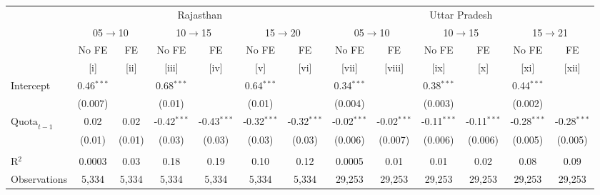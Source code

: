 
\begingroup
\centering
\scriptsize
\begin{adjustbox}{max width=\linewidth}
   \begin{threeparttable}[b]
      \begin{tabular}{lcccccccccccc}
         \toprule
          & \multicolumn{6}{c}{Rajasthan} & \multicolumn{6}{c}{Uttar Pradesh} \\ 
          & \multicolumn{2}{c}{05$\rightarrow$10} & \multicolumn{2}{c}{10$\rightarrow$15} & \multicolumn{2}{c}{15$\rightarrow$20} & \multicolumn{2}{c}{05$\rightarrow$10} & \multicolumn{2}{c}{10$\rightarrow$15} & \multicolumn{2}{c}{15$\rightarrow$21} \\ 
                               & No FE        & FE            & No FE         & FE            & No FE         & FE            & No FE         & FE            & No FE         & FE            & No FE         & FE \\   
                               & [i]          & [ii]          & [iii]         & [iv]          & [v]           & [vi]          & [vii]         & [viii]        & [ix]          & [x]           & [xi]          & [xii]\\  
         \midrule 
         Intercept             & 0.46$^{***}$ &               & 0.68$^{***}$  &               & 0.64$^{***}$  &               & 0.34$^{***}$  &               & 0.38$^{***}$  &               & 0.44$^{***}$  &   \\   
                               & (0.007)      &               & (0.01)        &               & (0.01)        &               & (0.004)       &               & (0.003)       &               & (0.002)       &   \\   
         $\text{Quota}_{t-1}$  & 0.02         & 0.02          & -0.42$^{***}$ & -0.43$^{***}$ & -0.32$^{***}$ & -0.32$^{***}$ & -0.02$^{***}$ & -0.02$^{***}$ & -0.11$^{***}$ & -0.11$^{***}$ & -0.28$^{***}$ & -0.28$^{***}$\\   
                               & (0.01)       & (0.01)        & (0.03)        & (0.03)        & (0.03)        & (0.03)        & (0.006)       & (0.007)       & (0.006)       & (0.006)       & (0.005)       & (0.005)\\   
          \\
         R$^2$                 & 0.0003       & 0.03          & 0.18          & 0.19          & 0.10          & 0.12          & 0.0005        & 0.01          & 0.01          & 0.02          & 0.08          & 0.09\\  
         Observations          & 5,334        & 5,334         & 5,334         & 5,334         & 5,334         & 5,334         & 29,253        & 29,253        & 29,253        & 29,253        & 29,253        & 29,253\\  

\end{tabular}
\end{threeparttable}
\end{adjustbox}
